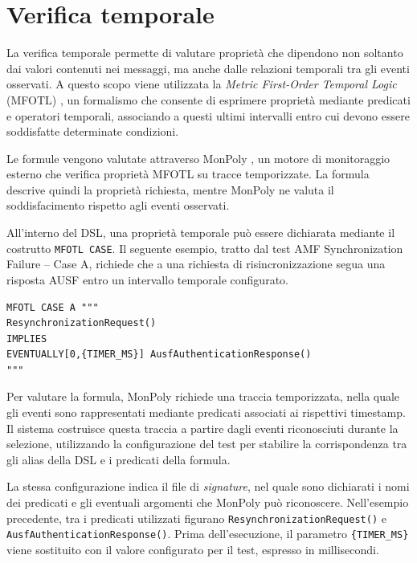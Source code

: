 \section{Verifica temporale}\label{verifica-temporale}

La verifica temporale permette di valutare proprietà che dipendono non soltanto dai valori contenuti nei messaggi, ma anche dalle relazioni temporali tra gli eventi osservati. A questo scopo viene utilizzata la \emph{Metric First-Order Temporal Logic} (MFOTL) \cite{basin_mfotl_2015}, un formalismo che consente di esprimere proprietà mediante predicati e operatori temporali, associando a questi ultimi intervalli entro cui devono essere soddisfatte determinate condizioni.

Le formule vengono valutate attraverso MonPoly \cite{basin_monpoly_2017}, un motore di monitoraggio esterno che verifica proprietà MFOTL su tracce temporizzate. La formula descrive quindi la proprietà richiesta, mentre MonPoly ne valuta il soddisfacimento rispetto agli eventi osservati.

All'interno del DSL, una proprietà temporale può essere dichiarata mediante il costrutto \texttt{MFOTL CASE}. Il seguente esempio, tratto dal test AMF Synchronization Failure -- Case A, richiede che a una richiesta di risincronizzazione segua una risposta AUSF entro un intervallo temporale configurato.

\par\noindent\begin{minipage}{\linewidth}
\begin{lstlisting}
MFOTL CASE A """
ResynchronizationRequest()
IMPLIES
EVENTUALLY[0,{TIMER_MS}] AusfAuthenticationResponse()
"""
\end{lstlisting}
\end{minipage}\par

Per valutare la formula, MonPoly richiede una traccia temporizzata, nella quale gli eventi sono rappresentati mediante predicati associati ai rispettivi timestamp. Il sistema costruisce questa traccia a partire dagli eventi riconosciuti durante la selezione, utilizzando la configurazione del test per stabilire la corrispondenza tra gli alias della DSL e i predicati della formula.

La stessa configurazione indica il file di \emph{signature}, nel quale sono dichiarati i nomi dei predicati e gli eventuali argomenti che MonPoly può riconoscere. Nell'esempio precedente, tra i predicati utilizzati figurano \texttt{ResynchronizationRequest()} e \texttt{AusfAuthenticationResponse()}. Prima dell'esecuzione, il parametro \texttt{\{TIMER\_MS\}} viene sostituito con il valore configurato per il test, espresso in millisecondi.

